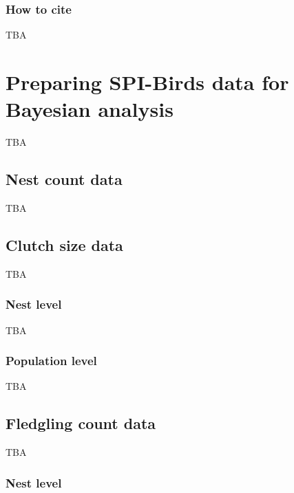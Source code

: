 \documentclass[
]{book}
\begin{document}
\hypertarget{how-to-cite}{%
\subsection*{How to cite}\label{how-to-cite}}

TBA

\hypertarget{DataPrep}{%
\chapter{Preparing SPI-Birds data for Bayesian analysis}\label{DataPrep}}

TBA

\hypertarget{nest-count-data}{%
\section{Nest count data}\label{nest-count-data}}

TBA

\hypertarget{clutch-size-data}{%
\section{Clutch size data}\label{clutch-size-data}}

TBA

\hypertarget{nest-level}{%
\subsection{Nest level}\label{nest-level}}

TBA

\hypertarget{population-level}{%
\subsection{Population level}\label{population-level}}

TBA

\hypertarget{fledgling-count-data}{%
\section{Fledgling count data}\label{fledgling-count-data}}

TBA

\hypertarget{nest-level-1}{%
\subsection{Nest level}\label{nest-level-1}}
\end{document}
